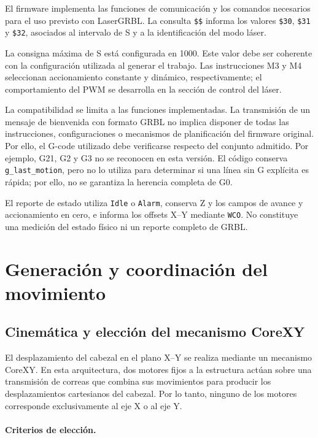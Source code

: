 \documentclass[blue,fullpaper]{ludusofficial}  %
\begin{document}
El firmware implementa las funciones de comunicación
y los comandos necesarios para el uso previsto
con LaserGRBL. La consulta \texttt{\$\$} informa
los valores \texttt{\$30}, \texttt{\$31} y
\texttt{\$32}, asociados al intervalo de S y
a la identificación del modo láser.

La consigna máxima de S está configurada en 1000.
Este valor debe ser coherente con la configuración
utilizada al generar el trabajo. Las instrucciones M3
y M4 seleccionan accionamiento constante y dinámico,
respectivamente; el comportamiento del PWM se desarrolla
en la sección de control del láser.

La compatibilidad se limita a las funciones implementadas.
La transmisión de un mensaje de bienvenida con formato
GRBL no implica disponer de todas las instrucciones,
configuraciones o mecanismos de planificación del
firmware original. Por ello, el G-code utilizado
debe verificarse respecto del conjunto admitido. Por ejemplo, G21, G2 y G3 no se reconocen en esta versión. El código conserva \texttt{g\_last\_motion}, pero no lo utiliza para determinar si una línea sin G explícita es rápida; por ello, no se garantiza la herencia completa de G0.

El reporte de estado utiliza \texttt{Idle} o \texttt{Alarm}, conserva Z y los campos de avance y accionamiento en cero, e informa los offsets X--Y mediante \texttt{WCO}. No constituye una medición del estado físico ni un reporte completo de GRBL.


\section{Generación y coordinación del movimiento}
\label{sec:movimiento}

\subsection{Cinemática y elección del mecanismo CoreXY}

El desplazamiento del cabezal en el plano X--Y
se realiza mediante un mecanismo CoreXY.
En esta arquitectura, dos motores fijos
a la estructura actúan sobre una transmisión
de correas que combina sus movimientos
para producir los desplazamientos cartesianos
del cabezal. Por lo tanto, ninguno de los
motores corresponde exclusivamente al eje X
o al eje Y.

\paragraph{Criterios de elección.}
\end{document}
